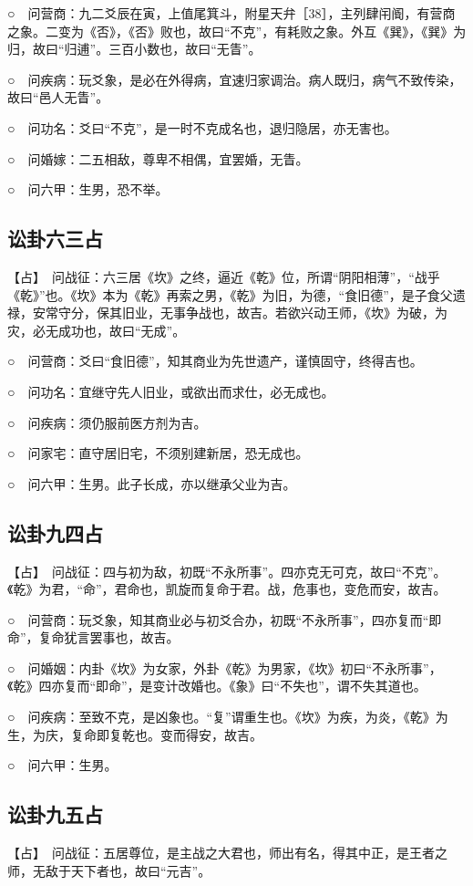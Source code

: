 \documentclass[12pt,oneside]{book}
\begin{document}
○　问营商：九二爻辰在寅，上值尾箕斗，附星天弁［38］，主列肆闬阍，有营商之象。二变为《否》，《否》败也，故曰“不克”，有耗败之象。外互《巽》，《巽》为归，故曰“归逋”。三百小数也，故曰“无眚”。

○　问疾病：玩爻象，是必在外得病，宜速归家调治。病人既归，病气不致传染，故曰“邑人无眚”。

○　问功名：爻曰“不克”，是一时不克成名也，退归隐居，亦无害也。

○　问婚嫁：二五相敌，尊卑不相偶，宜罢婚，无眚。

○　问六甲：生男，恐不举。

\subsection{讼卦六三占}
【占】　问战征：六三居《坎》之终，逼近《乾》位，所谓“阴阳相薄”，“战乎《乾》”也。《坎》本为《乾》再索之男，《乾》为旧，为德，“食旧德”，是子食父遗禄，安常守分，保其旧业，无事争战也，故吉。若欲兴动王师，《坎》为破，为灾，必无成功也，故曰“无成”。

○　问营商：爻曰“食旧德”，知其商业为先世遗产，谨慎固守，终得吉也。

○　问功名：宜继守先人旧业，或欲出而求仕，必无成也。

○　问疾病：须仍服前医方剂为吉。

○　问家宅：直守居旧宅，不须别建新居，恐无成也。

○　问六甲：生男。此子长成，亦以继承父业为吉。


\subsection{讼卦九四占}
【占】　问战征：四与初为敌，初既“不永所事”。四亦克无可克，故曰“不克”。《乾》为君，“命”，君命也，凯旋而复命于君。战，危事也，变危而安，故吉。

○　问营商：玩爻象，知其商业必与初爻合办，初既“不永所事”，四亦复而“即命”，复命犹言罢事也，故吉。

○　问婚姻：内卦《坎》为女家，外卦《乾》为男家，《坎》初曰“不永所事”，《乾》四亦复而“即命”，是变计改婚也。《象》曰“不失也”，谓不失其道也。

○　问疾病：至致不克，是凶象也。“复”谓重生也。《坎》为疾，为炎，《乾》为生，为庆，复命即复乾也。变而得安，故吉。

○　问六甲：生男。

\subsection{讼卦九五占}
【占】　问战征：五居尊位，是主战之大君也，师出有名，得其中正，是王者之师，无敌于天下者也，故曰“元吉”。
\end{document}
